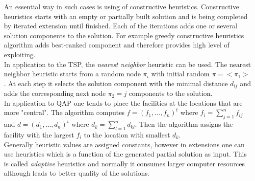 An essential way in such cases is using of constructive heuristics. Constructive heuristics starts with an empty or partially built solution and is being completed by iterated extension until finished. Each of the iterations adds one or several solution components to the solution. For example greedy constructive heuristics algorithm adds best-ranked component and therefore provides high level of exploiting. \\

In application to the TSP, the \emph{nearest neighbor} heuristic can be used. The nearest neighbor heuristic starts from a random node $\pi_i$ with initial random $\pi=<\pi_1>$. At each step it selects the solution component with the minimal distance $d_{ij}$ and adds the corresponding next node $\pi_2=j$ components to the solution. \\

In application to QAP one tends to place the facilities at the locations that are more "central". The algorithm computes $f=(f_1,...,f_n)^t$ where $f_i=\sum \limits_{j=1}^n {f_{ij}}$ and $d=(d_1,...,d_n)^t$ where $d_k=\sum \limits_{l=1}^n {d_{kl}}$. Then the algorithm assigns the facility with the largest $f_i$ to the location with smallest $d_k$. \\

Generally heuristic values are assigned constants, however in extensions one can use heuristics which is a function of the generated partial solution as input. This is called \emph{adaptive} heuristics and normally it consumes larger computer resources although leads to better quality of the solutions.